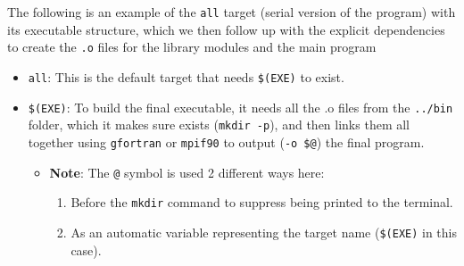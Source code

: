 \documentclass[
]{article}
\newenvironment{Shaded}{}{}
\newcommand{\CharTok}[1]{\textcolor[rgb]{0.25,0.44,0.63}{#1}}
\newcommand{\DataTypeTok}[1]{\textcolor[rgb]{0.56,0.13,0.00}{#1}}
\newcommand{\DecValTok}[1]{\textcolor[rgb]{0.25,0.63,0.44}{#1}}
\newcommand{\ErrorTok}[1]{\textcolor[rgb]{1.00,0.00,0.00}{\textbf{#1}}}
\newcommand{\FunctionTok}[1]{\textcolor[rgb]{0.02,0.16,0.49}{#1}}
\newcommand{\NormalTok}[1]{#1}
\providecommand{\tightlist}{%
  \setlength{\itemsep}{0pt}\setlength{\parskip}{0pt}}
\begin{document}
The following is an example of the \texttt{all} target (serial version
of the program) with its executable structure, which we then follow up
with the explicit dependencies to create the \texttt{.o} files for the
library modules and the main program

\begin{Shaded}
\end{Shaded}

\begin{itemize}
\tightlist
\item
  \texttt{all}: This is the default target that needs \texttt{\$(EXE)}
  to exist.
\item
  \texttt{\$(EXE)}: To build the final executable, it needs all the .o
  files from the \texttt{../bin} folder, which it makes sure exists
  (\texttt{mkdir\ -p}), and then links them all together using
  \texttt{gfortran} or \texttt{mpif90} to output (\texttt{-o\ \$@}) the
  final program.

  \begin{itemize}
  \tightlist
  \item
    \textbf{Note}: The \texttt{@} symbol is used 2 different ways here:

    \begin{enumerate}
    \def\labelenumi{\arabic{enumi}.}
    \tightlist
    \item
      Before the \texttt{mkdir} command to suppress being printed to the
      terminal.
    \item
      As an automatic variable representing the target name
      (\texttt{\$(EXE)} in this case).
    \end{enumerate}
  \end{itemize}
\end{itemize}
\end{document}
